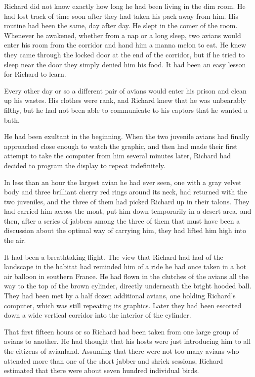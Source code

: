 \documentclass[]{article}
\begin{document}
{Richard did not know exactly how long he had been living in the dim room. He had lost track of time soon after they had taken his pack away from him. His routine had been the same, day after day. He slept in the comer of the room. Whenever he awakened, whether from a nap or a long sleep, two avians would enter his room from the corridor and hand him a manna melon to eat. He knew they came through the locked door at the end of the corridor, but if he tried to sleep near the door they simply denied him his food. It had been an easy lesson for Richard to learn.

Every other day or so a different pair of avians would enter his prison and clean up his wastes. His clothes were rank, and Richard knew that he was unbearably filthy, but he had not been able to communicate to his captors that he wanted a bath.

He had been exultant in the beginning. When the two juvenile avians had finally approached close enough to watch the graphic, and then had made their first attempt to take the computer from him several minutes later, Richard had decided to program the display to repeat indefinitely.

In less than an hour the largest avian he had ever seen, one with a gray velvet body and three brilliant cherry red rings around its neck, had returned with the two juveniles, and the three of them had picked Richard up in their talons. They had carried him across the moat, put him down temporarily in a desert area, and then, after a series of jabbers among the three of them that must have been a discussion about the optimal way of carrying him, they had lifted him high into the air.

It had been a breathtaking flight. The view that Richard had had of the landscape in the habitat had reminded him of a ride he had once taken in a hot air balloon in southern France. He had flown in the clutches of the avians all the way to the top of the brown cylinder, directly underneath the bright hooded ball. They had been met by a half dozen additional avians, one holding Richard’s computer, which was still repeating its graphics. Later they had been escorted down a wide vertical corridor into the interior of the cylinder.

That first fifteen hours or so Richard had been taken from one large group of avians to another. He had thought that his hosts were just introducing him to all the citizens of avianland. Assuming that there were not too many avians who attended more than one of the short jabber and shriek sessions, Richard estimated that there were about seven hundred individual birds.

}
\end{document}
